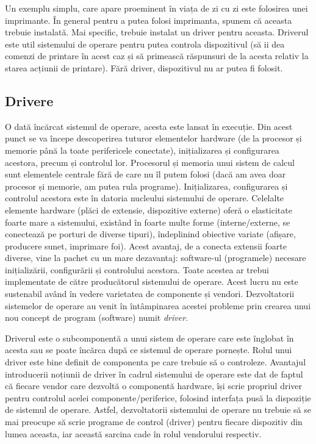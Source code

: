 Un exemplu simplu, care apare proeminent în viața de zi cu zi este folosirea unei imprimante.
În general pentru a putea folosi imprimanta, spunem că aceasta trebuie instalată.
Mai specific, trebuie instalat un driver pentru aceasta.
 Driverul este util sistemului de operare pentru putea controla dispozitivul (să ii dea comenzi de printare în acest caz și să primească răspunsuri de la acesta relativ la starea acțiunii de printare).
Fără driver, dispozitivul nu ar putea fi folosit.

\subsection{Drivere}
\label{sec:hw:os-interact:driver}

O dată încărcat sistemul de operare, acesta este lansat în execuție.
Din acest punct se va începe descoperirea tuturor elementelor hardware (de la procesor și memorie până la toate perifericele conectate), inițializarea și configurarea acestora, precum și controlul lor.
Procesorul și memoria unui sistem de calcul sunt elementele centrale fără de care nu îl putem folosi (dacă am avea doar procesor și memorie, am putea rula programe).
Inițializarea, configurarea și controlul acestora este în datoria nucleului sistemului de operare.
Celelalte elemente hardware (plăci de extensie, dispozitive externe) oferă o elasticitate foarte mare a sistemului, existând în foarte multe forme (interne/externe, se conectează pe porturi de diverse tipuri), îndeplinind obiective variate (afișare, producere sunet, imprimare foi).
Acest avantaj, de a conecta extensii foarte diverse, vine la pachet cu un mare dezavantaj: software-ul (programele) necesare inițializării, configurării și controlului acestora.
Toate acestea ar trebui implementate de către producătorul sistemului de operare.
Acest lucru nu este sustenabil având în vedere varietatea de componente și vendori.
 Dezvoltatorii sistemelor de operare au venit în întâmpinarea acestei probleme prin crearea unui nou concept de program (software) numit \textit{driver}.

Driverul este o subcomponentă a unui sistem de operare care este înglobat în acesta sau se poate încărca după ce sistemul de operare pornește.
Rolul unui driver este bine definit de componenta pe care trebuie să o controleze.
 Avantajul introducerii noțiunii de driver în cadrul sistemului de operare este dat de faptul că fiecare vendor care dezvoltă o componentă hardware, își scrie propriul driver pentru controlul acelei componente/periferice, folosind interfața pusă la dispoziție de sistemul de operare.
Astfel, dezvoltatorii sistemului de operare nu trebuie să se mai preocupe să scrie programe de control (driver) pentru fiecare dispozitiv din lumea aceasta, iar această sarcina cade în rolul vendorului respectiv.

